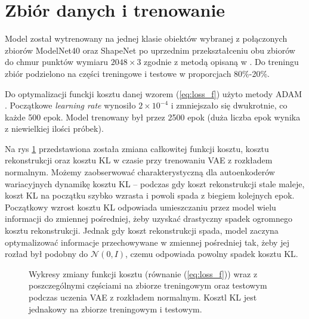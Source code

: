 \documentclass{iithesis}
\begin{document}
%

\section{Zbiór danych i trenowanie} \label{sec:training_process}
Model został wytrenowany na jednej klasie obiektów wybranej z połączonych zbiorów ModelNet40 \cite{modelnet}
oraz ShapeNet \cite{shapenet} po uprzednim przekształceniu obu zbiorów do
chmur punktów wymiaru $2048 \times 3$ zgodnie z metodą opisaną w \cite{pc_convert_method}.
Do treningu zbiór podzielono na części treningowe i testowe w proporcjach 80\%-20\%.

Do optymalizacji funckji kosztu danej wzorem (\ref{eq:loss_f}) użyto metody ADAM \cite{adam}. Początkowe
\textit{learning rate} wynosiło $2 \times 10^{-4}$ i zmniejszało się dwukrotnie, co każde 500 epok.
Model trenowany był przez 2500 epok (duża liczba epok wynika z niewielkiej ilości próbek).

Na rys \ref{fig:loss_decrease} przedstawiona została zmiana całkowitej funkcji kosztu,
kosztu rekonstrukcji oraz kosztu KL w czasie przy trenowaniu VAE z rozkładem normalnym.
Możemy zaobserwować charakterystyczną dla autoenkoderów
wariacyjnych dynamikę kosztu KL -- podczas gdy koszt rekonstrukcji stale maleje, koszt KL na początku
szybko wzrasta i powoli spada z biegiem kolejnych epok. Początkowy wzrost kosztu KL odpowiada umieszczaniu
przez model wielu informacji do zmiennej pośredniej,
żeby uzyskać drastyczny spadek ogromnego kosztu rekonstrukcji. Jednak gdy koszt rekonstrukcji spada,
model zaczyna optymalizować informacje przechowywane w zmiennej pośredniej
tak, żeby jej rozład był podobny do $\mathcal{N}(0, I)$, czemu odpowiada powolny spadek kosztu KL.

\begin{figure}

    \vspace*{\floatsep }

    \caption{\label{fig:loss_decrease} Wykresy zmiany funkcji kosztu (równanie (\ref{eq:loss_f}))
    wraz z poszczególnymi częściami na zbiorze treningowym oraz testowym podczas
    uczenia VAE z rozkładem normalnym. Kosztl KL jest jednakowy na zbiorze treningowym i testowym.}
\end{figure}
\end{document}
